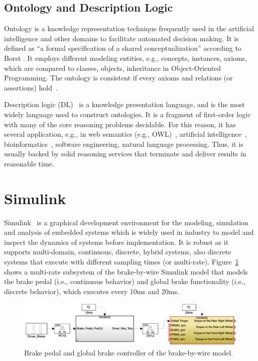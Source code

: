 \subsection*{Ontology and Description Logic}
Ontology is a knowledge representation technique frequently used in the artificial intelligence and other domains to facilitate automated decision making. It is defined as ``a formal specification of a shared conceptualization'' according to Borst \cite{Borst1997ConstructionOntologies}. It employs different modeling entities, e.g., concepts, instances, axioms, which are compared to classes, objects, inheritance in Object-Oriented Programming. The ontology is consistent if every axioms and relations (or assertions) hold~\cite{Mankovskii2009OWL:Language}.

Description logic (DL)~\cite{Baader2010TheApplications} is a knowledge presentation language, and is the most widely language used to construct ontologies. It is a fragment of first-order logic with many of the core reasoning problems decidable. For this reason, it has several application, e.g., in web semantics (e.g., OWL)~\cite{conf/owled/ShearerMH08}, artificial intelligence~\cite{10.1007/978-94-017-9297-4_7}, bioinformatics~\cite{Rector2006}, software engineering, natural language processing. Thus, it is usually backed by solid reasoning services that terminate and deliver results in reasonable time. 

\section{Simulink}
Simulink~\cite{JamesB.Dabney2003MasteringSimulink} is a graphical development environment for the modeling, simulation and analysis of embedded systems which is widely used in industry to model and inspect the dynamics of systems before implementation. It is robust as it supports multi-domain, continuous, discrete, hybrid systems, also discrete systems that execute with different sampling times (or multi-rate). Figure~\ref{fig_sm_multi-rate} shows a multi-rate subsystem of the brake-by-wire Simulink model that models the brake pedal (i.e., continuous behavior) and global brake functionality (i.e., discrete behavior), which executes every 10ms and 20ms.  
\begin{figure}[h]
	\centering
	\includegraphics[width=0.9\linewidth]{images/sm}
	\caption{Brake pedal and global brake controller of the brake-by-wire model.}
	\label{fig_sm_multi-rate}
\end{figure}

